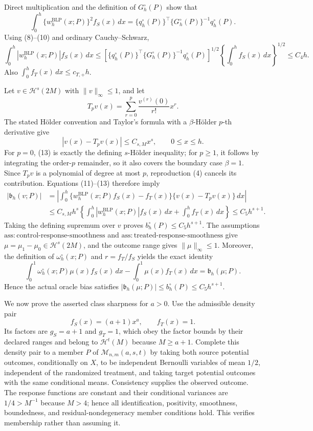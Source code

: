 Direct multiplication and the definition of \(G_h^{\circ}(P)\) show that
\[
\int_0^h\{w_h^{\mathrm{BLP}}(x;P)\}^2f_S(x)\,dx
=\{q_h^{\circ}(P)\}^\top\{G_h^{\circ}(P)\}^{-1}q_h^{\circ}(P).
\tag{10}
\]
Using (8)--(10) and ordinary Cauchy--Schwarz,
\[
\int_0^h|w_h^{\mathrm{BLP}}(x;P)|f_S(x)\,dx
\le
\left[\{q_h^{\circ}(P)\}^\top\{G_h^{\circ}(P)\}^{-1}q_h^{\circ}(P)\right]^{1/2}
\left\{\int_0^hf_S(x)\,dx\right\}^{1/2}
\le C_4h.
\tag{11}
\]
Also \(\int_0^hf_T(x)\,dx\le c_{T,+}h\).

Let \(v\in\mathcal H^s(2M)\) with \(\|v\|_\infty\le1\), and let
\[
T_pv(x)=\sum_{r=0}^p\frac{v^{(r)}(0)}{r!}x^r.
\tag{12}
\]
The stated H\"older convention and Taylor's formula with a \(\beta\)-H\"older \(p\)-th derivative give
\[
|v(x)-T_pv(x)|\le C_{s,M}x^s,
\qquad 0\le x\le h.
\tag{13}
\]
For \(p=0\), (13) is exactly the defining \(s\)-H\"older inequality; for \(p\ge1\), it follows by integrating the order-\(p\) remainder, so it also covers the boundary case \(\beta=1\). Since \(T_pv\) is a polynomial of degree at most \(p\), reproduction (4) cancels its contribution. Equations (11)--(13) therefore imply
\[
\begin{aligned}
|\mathfrak b_h(v;P)|
&=\left|\int_0^h\{w_h^{\mathrm{BLP}}(x;P)f_S(x)-f_T(x)\}\{v(x)-T_pv(x)\}\,dx\right|\\
&\le C_{s,M}h^s
\left\{\int_0^h|w_h^{\mathrm{BLP}}(x;P)|f_S(x)\,dx+\int_0^hf_T(x)\,dx\right\}
\le C_5h^{s+1}.
\end{aligned}
\tag{14}
\]
Taking the defining supremum over \(v\) proves \(b_h^{\circ}(P)\le C_5h^{s+1}\). The assumptions \(\mathrm{ass:control\text{-}response\text{-}smoothness}\) and \(\mathrm{ass:treated\text{-}response\text{-}smoothness}\) give \(\mu=\mu_1-\mu_0\in\mathcal H^s(2M)\), and the outcome range gives \(\|\mu\|_\infty\le1\). Moreover, the definition of \(\omega_h^{\circ}(x;P)\) and \(r=f_T/f_S\) yields the exact identity
\[
\int_0^1\omega_h^{\circ}(x;P)\mu(x)f_S(x)\,dx-
\int_0^1\mu(x)f_T(x)\,dx=\mathfrak b_h(\mu;P).
\tag{15}
\]
Hence the actual oracle bias satisfies \(|\mathfrak b_h(\mu;P)|\le b_h^{\circ}(P)\le C_5h^{s+1}\).

We now prove the asserted class sharpness for \(a>0\). Use the admissible density pair
\[
f_S(x)=(a+1)x^a,
\qquad f_T(x)=1.
\tag{16}
\]
Its factors are \(g_S=a+1\) and \(g_T=1\), which obey the factor bounds by their declared ranges and belong to \(\mathcal H^t(M)\) because \(M\ge a+1\). Complete this density pair to a member \(P\) of \(\mathcal M_{n,m}(a,s,t)\) by taking both source potential outcomes, conditionally on \(X\), to be independent Bernoulli variables of mean \(1/2\), independent of the randomized treatment, and taking target potential outcomes with the same conditional means. Consistency supplies the observed outcome. The response functions are constant and their conditional variances are \(1/4>M^{-1}\) because \(M>4\); hence all identification, positivity, smoothness, boundedness, and residual-nondegeneracy member conditions hold. This verifies membership rather than assuming it.

